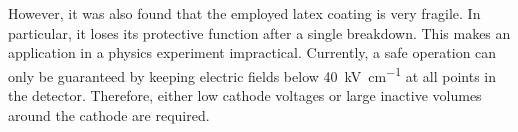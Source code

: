 However, it was also found that the employed latex coating is very fragile.
In particular, it loses its protective function after a single breakdown.
This makes an application in a physics experiment impractical.
Currently, a safe \lartpc{} operation can only be guaranteed by keeping electric fields below \SI{40}{\kilo\volt\per\centi\metre} at all points in the detector.
Therefore, either low cathode voltages or large inactive volumes around the cathode are required.